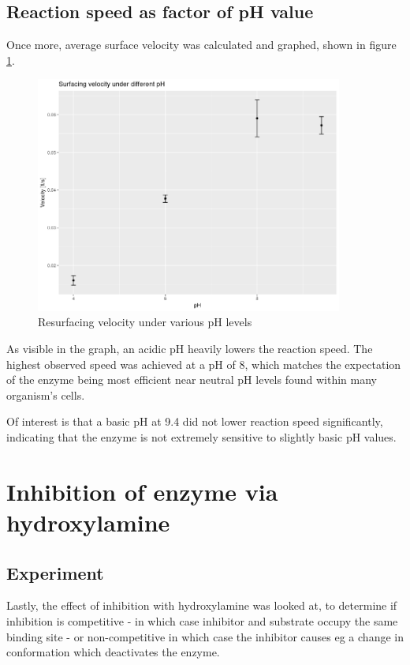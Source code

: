 \documentclass[a4paper,english]{scrreprt}
\begin{document}
\subsection{Reaction speed as factor of pH value}

Once more, average surface velocity was calculated and graphed, shown in figure
\ref{fig:ph}.

\begin{figure}
	\centering
	\includegraphics[width=0.9\textwidth]{img/ph.png}
	\caption{Resurfacing velocity under various pH levels}
	\label{fig:ph}
\end{figure}

As visible in the graph, an acidic pH heavily lowers the reaction speed. The
highest observed speed was achieved at a pH of 8, which matches the expectation
of the enzyme being most efficient near neutral pH levels found within many
organism's cells.

Of interest is that a basic pH at 9.4 did not lower reaction speed
significantly, indicating that the enzyme is not extremely sensitive to
slightly basic pH values.

\section{Inhibition of enzyme via hydroxylamine}

\subsection{Experiment}

Lastly, the effect of inhibition with hydroxylamine was looked at, to determine
if inhibition is competitive - in which case inhibitor and substrate occupy the
same binding site - or non-competitive in which case the inhibitor causes eg a
change in conformation which deactivates the enzyme.
\end{document}
